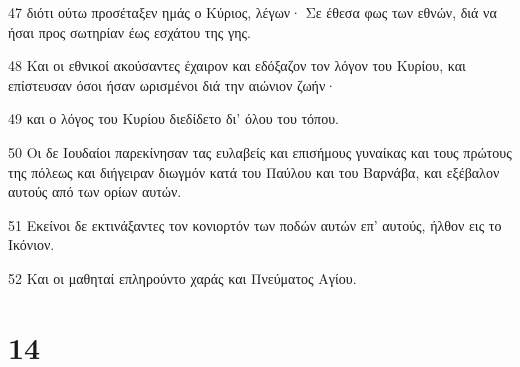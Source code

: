 \par 47 διότι ούτω προσέταξεν ημάς ο Κύριος, λέγων· Σε έθεσα φως των εθνών, διά να ήσαι προς σωτηρίαν έως εσχάτου της γης.
\par 48 Και οι εθνικοί ακούσαντες έχαιρον και εδόξαζον τον λόγον του Κυρίου, και επίστευσαν όσοι ήσαν ωρισμένοι διά την αιώνιον ζωήν·
\par 49 και ο λόγος του Κυρίου διεδίδετο δι' όλου του τόπου.
\par 50 Οι δε Ιουδαίοι παρεκίνησαν τας ευλαβείς και επισήμους γυναίκας και τους πρώτους της πόλεως και διήγειραν διωγμόν κατά του Παύλου και του Βαρνάβα, και εξέβαλον αυτούς από των ορίων αυτών.
\par 51 Εκείνοι δε εκτινάξαντες τον κονιορτόν των ποδών αυτών επ' αυτούς, ήλθον εις το Ικόνιον.
\par 52 Και οι μαθηταί επληρούντο χαράς και Πνεύματος Αγίου.

\chapter{14}

